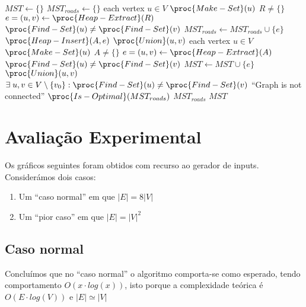\documentclass[a4paper]{article}
\begin{document}
\begin{codebox}
	\li $MST \gets \{\}$
	\li $MST_{roads} \gets \{\}$
	\li \For each vertex $u \in V$ \Do
	\li 	$\proc{Make-Set}(u)$
		\End
	\zi
	\li \While $R \ne \{\}$ \Do
	\li 	$e = (u, v) \gets \proc{Heap-Extract}(R)$
	\li		\If $\proc{Find-Set}(u) \ne \proc{Find-Set}(v)$ \Then
	\li			$MST_{roads} \gets MST_{roads} \cup \{e\}$
	\li			$\proc{Heap-Insert}(A, e)$
	\li			$\proc{Union}(u, v)$
			\End
		\End
	\zi
	\li \For each vertex $u \in V$ \Do
	\li 	$\proc{Make-Set}(u)$
		\End
	\zi
	\li \While $A \ne \{\}$ \Do
	\li 	$e = (u, v) \gets \proc{Heap-Extract}(A)$
	\li		\If $\proc{Find-Set}(u) \ne \proc{Find-Set}(v)$ \Then
	\li			$MST \gets MST \cup \{e\}$
	\li			$\proc{Union}(u, v)$
			\End
		\End
	\zi
	\li \If $\exists\; u, v \in V \setminus \{v_0\}: \proc{Find-Set}(u) \ne \proc{Find-Set}(v)$ \Then
	\li \Error ``Graph is not connected''
		\End
	\li \If $\proc{Is-Optimal}(MST_{roads})$ \Then
	\li		\Return $MST_{roads}$
	\li	\Else
	\li		\Return $MST$
		\End
\end{codebox}
\newpage

\section{Avaliação Experimental}
Os gráficos seguintes foram obtidos com recurso ao gerador de inputs.
Considerámos dois casos:
\begin{enumerate}
	\item Um ``caso normal'' em que $|E| = 8|V|$
	\item Um ``pior caso'' em que $|E| = |V|^2$
\end{enumerate}

\subsection{Caso normal}
Concluímos que no ``caso normal'' o algoritmo comporta-se como esperado, tendo comportamento
$O(x\cdot log(x))$, isto porque a complexidade teórica é $O(E\cdot log(V))$ e $|E| \simeq |V|$
\end{document}
